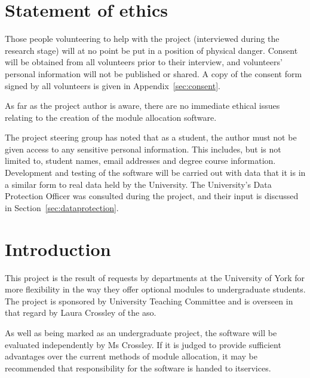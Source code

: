 \documentclass[]{scrartcl}
\begin{document}
\newpage

\tableofcontents

\newpage

\section{Statement of ethics}


Those people volunteering to help with the project (interviewed during the
research stage) will at no point be put in a position of physical danger.
Consent will be obtained from all volunteers prior to their interview, and
volunteers' personal information will not be published or shared. A copy of
the consent form signed by all volunteers is given in
Appendix~\ref{sec:consent}.


As far as the project author is aware, there are no immediate ethical issues
relating to the creation of the module allocation software.


The project steering group has noted that as a student, the author must not be
given access to any sensitive personal information. This includes, but is not
limited to, student names, email addresses and degree course information.
Development and testing of the software will be carried out with data that it
is in a similar form to real data held by the University. The University's
Data Protection Officer was consulted during the project, and their input is
discussed in Section~\ref{sec:dataprotection}.

\section{Introduction}


This project is the result of requests by departments at the University of
York for more flexibility in the way they offer optional modules to
undergraduate students. The project is sponsored by University Teaching
Committee and is overseen in that regard by Laura Crossley of the \gls{aso}.

As well as being marked as an undergraduate project, the software will be
evaluated independently by Ms Crossley. If it is judged to provide sufficient
advantages over the current methods of module allocation, it may be
recommended that responsibility for the software is handed to \gls{itservices}.
\end{document}

